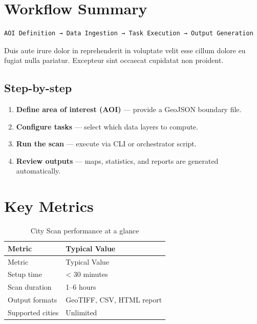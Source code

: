 \documentclass[
  letterpaper,
  DIV=11,
  numbers=noendperiod]{scrreprt}
\providecommand{\tightlist}{%
  \setlength{\itemsep}{0pt}\setlength{\parskip}{0pt}}
\begin{document}
\section{Workflow Summary}\label{workflow-summary}

\begin{verbatim}
AOI Definition → Data Ingestion → Task Execution → Output Generation
\end{verbatim}

Duis aute irure dolor in reprehenderit in voluptate velit esse cillum
dolore eu fugiat nulla pariatur. Excepteur sint occaecat cupidatat non
proident.

\subsection{Step-by-step}\label{step-by-step}

\begin{enumerate}
\def\labelenumi{\arabic{enumi}.}
\tightlist
\item
  \textbf{Define area of interest (AOI)} --- provide a GeoJSON boundary
  file.
\item
  \textbf{Configure tasks} --- select which data layers to compute.
\item
  \textbf{Run the scan} --- execute via CLI or orchestrator script.
\item
  \textbf{Review outputs} --- maps, statistics, and reports are
  generated automatically.
\end{enumerate}

\section{Key Metrics}\label{key-metrics}

\begin{longtable}[]{@{}ll@{}}
\caption{City Scan performance at a
glance}\label{tbl-metrics}\tabularnewline
\toprule\noalign{}
Metric & Typical Value \\
\midrule\noalign{}
\endfirsthead
\toprule\noalign{}
Metric & Typical Value \\
\midrule\noalign{}
\endhead
\bottomrule\noalign{}
\endlastfoot
Setup time & \textless{} 30 minutes \\
Scan duration & 1--6 hours \\
Output formats & GeoTIFF, CSV, HTML report \\
Supported cities & Unlimited \\
\end{longtable}
\end{document}
